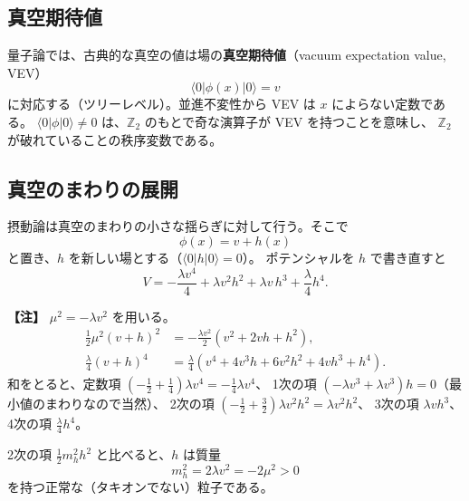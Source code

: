 \documentclass[uplatex,dvipdfmx,a4paper,11pt,openany]{jsbook}
\newcommand{\term}[2]{\textbf{#1}（#2）}
\newenvironment{note}{\vspace{1ex}\par\footnotesize\noindent\textbf{【注】}}{\par\vspace{1ex}}
\numberwithin{equation}{chapter}
\theoremstyle{definition}
\theoremstyle{plain}
\theoremstyle{remark}
\begin{document}
\subsection{真空期待値}
量子論では、古典的な真空の値は場の\term{真空期待値}{vacuum expectation value, VEV}
\begin{equation}
\langle0|\phi(x)|0\rangle=v
\end{equation}
に対応する（ツリーレベル）。並進不変性から VEV は $x$ によらない定数である。
$\langle0|\phi|0\rangle\ne0$ は、$\mathbb Z_2$ のもとで奇な演算子が VEV を持つことを意味し、
$\mathbb Z_2$ が破れていることの秩序変数である。
\subsection{真空のまわりの展開}
摂動論は真空のまわりの小さな揺らぎに対して行う。そこで
\begin{equation}
\phi(x)=v+h(x)
\label{eq:Z2-shift}
\end{equation}
と置き、$h$ を新しい場とする（$\langle0|h|0\rangle=0$）。
ポテンシャルを $h$ で書き直すと
\begin{equation}
V=-\frac{\lambda v^4}{4}+\lambda v^2h^2+\lambda v\,h^3+\frac\lambda4h^4 .
\label{eq:Z2-shifted}
\end{equation}
\begin{note}
$\mu^2=-\lambda v^2$ を用いる。
\begin{align*}
\frac12\mu^2(v+h)^2&=-\frac{\lambda v^2}{2}\left(v^2+2vh+h^2\right),\\
\frac\lambda4(v+h)^4&=\frac\lambda4\left(v^4+4v^3h+6v^2h^2+4vh^3+h^4\right).
\end{align*}
和をとると、定数項 $(-\frac12+\frac14)\lambda v^4=-\frac14\lambda v^4$、
1次の項 $(-\lambda v^3+\lambda v^3)h=0$（最小値のまわりなので当然）、
2次の項 $(-\frac12+\frac32)\lambda v^2h^2=\lambda v^2h^2$、
3次の項 $\lambda vh^3$、4次の項 $\frac\lambda4h^4$。
\end{note}
2次の項 $\frac12m_h^2h^2$ と比べると、$h$ は質量
\begin{equation}
m_h^2=2\lambda v^2=-2\mu^2>0
\label{eq:Z2-mass}
\end{equation}
を持つ正常な（タキオンでない）粒子である。
\end{document}
